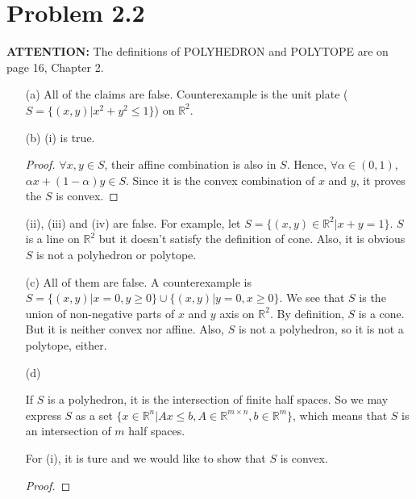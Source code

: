\documentclass[12pt]{article}
\begin{document}
\section*{Problem 2.2}

\textbf{\color{red}ATTENTION: } The definitions of POLYHEDRON and POLYTOPE are on page 16, Chapter 2.

\begin{enumerate}
\item [(a)]
All of the claims are false. Counterexample is the unit plate ($S = \{(x, y) | x^2 + y^2 \leqslant 1\}$) on $\mathbb{R}^2$.

\vspace{50mm}

\item [(b)]
(i) is true. 
\begin{proof}

$\forall x, y \in S$, their affine combination is also in $S$. Hence, $\forall \alpha \in (0, 1)$, $\alpha x + (1-\alpha) y \in S$. Since it is the convex combination of $x$ and $y$, it proves the $S$ is convex.

\end{proof}

(ii), (iii) and (iv) are false. For example, let $S = \{(x, y) \in \mathbb{R}^2 | x + y = 1\}$. $S$ is a line on $\mathbb{R}^2$ but it doesn't satisfy the definition of cone. Also, it is obvious $S$ is not a polyhedron or polytope.

\vspace{50mm}

\item[(c)] 
All of them are false. A counterexample is $S = \{(x, y)| x = 0, y \geqslant 0 
\} \cup \{(x, y)| y = 0, x \geqslant 0 \} $. We see that $S$ is the union of non-negative parts of $x$ and $y$ axis on $\mathbb{R}^2$. By definition, $S$ is a cone. But it is neither convex nor affine. Also, $S$ is not a polyhedron, so it is not a polytope, either. 

\vspace{50mm}

\item [(d)]

If $S$ is a polyhedron, it is the intersection of finite half spaces. So we may express $S$ as a set $\{x\in \mathbb{R}^n | Ax \leqslant b, A\in \mathbb{R}^{m\times n}, b\in\mathbb{R}^m \}$, which means that $S$ is an intersection of $m$ half spaces.

For (i), it is ture and we would like to show that $S$ is convex.
\begin{proof}


\end{proof}
\end{enumerate}
\end{document}
